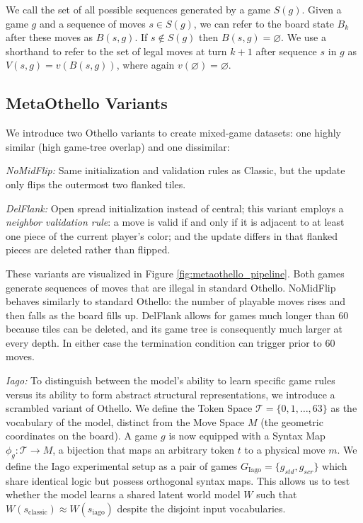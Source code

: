 \documentclass{article}
\theoremstyle{plain}
\theoremstyle{definition}
\theoremstyle{remark}
\begin{document}
We call the set of all possible sequences generated by a game $S(g)$. Given a game $g$ and a sequence of moves $s \in S(g)$, we can refer to the board state $B_k$ after these moves as $B(s, g)$. If $s \notin S(g)$ then $B(s, g) = \varnothing$. We use a shorthand to refer to the set of legal moves at turn $k+1$ after sequence $s$ in $g$ as $V(s, g)  = v(B(s, g))$, where again $v(\varnothing) = \varnothing$.

\subsection{MetaOthello Variants}

We introduce two Othello variants to create mixed-game datasets: one highly similar (high game-tree overlap) and one dissimilar: 

\textit{NoMidFlip:} Same initialization and validation rules as Classic, but the update only flips the outermost two flanked tiles.

\textit{DelFlank:} Open spread initialization instead of central; this variant employs a \textit{neighbor validation rule}: a move is valid if and only if it is adjacent to at least one piece of the current player's color; and the update differs in that flanked pieces are deleted rather than flipped.

These variants are visualized in Figure \ref{fig:metaothello_pipeline}. Both games generate sequences of moves that are illegal in standard Othello. NoMidFlip behaves similarly to standard Othello: the number of playable moves rises and then falls as the board fills up. DelFlank allows for games much longer than 60 because tiles can be deleted, and its game tree is consequently much larger at every depth. In either case the termination condition can trigger prior to 60 moves.

\textit{Iago:} To distinguish between the model's ability to learn specific game rules versus its ability to form abstract structural representations, we introduce a scrambled variant of Othello. We define the Token Space $\mathcal{T} = \{0, 1, \ldots, 63\}$ as the vocabulary of the model, distinct from the Move Space $M$ (the geometric coordinates on the board). A game $g$ is now equipped with a Syntax Map $\phi_g: \mathcal{T} \to M$, a bijection that maps an arbitrary token $t$ to a physical move $m$. We define the Iago experimental setup as a pair of games $G_{\text{Iago}} = \{g_{std}, g_{scr}\}$ which share identical logic but possess orthogonal syntax maps. This allows us to test whether the model learns a shared latent world model $W$ such that $W(s_{\text{classic}}) \approx W(s_{\text{iago}})$ despite the disjoint input vocabularies.
\end{document}
